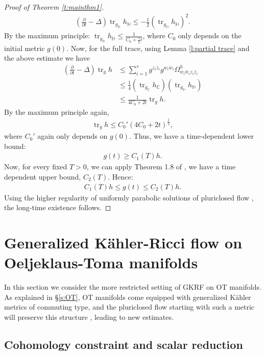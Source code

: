 \documentclass[12pt]{amsart}
\numberwithin{equation}{section}
\numberwithin{prop}{section}
\theoremstyle{definition}
\renewcommand{\bar}[1]{\overline{#1}}
\begin{document}
\begin{proof}[Proof of Theorem \ref{t:mainthm1}]
\begin{align*}
    \left(\frac{\partial}{\partial t} -\Delta \right)\operatorname{tr}_{g_\mathbb{H}}h_{\mathbb{H}} \leq - \frac{1}{2}(\operatorname{tr}_{g_\mathbb{H}}h_{\mathbb{H}})^2.
\end{align*}
By the maximum principle: $\operatorname{tr}_{g_\mathbb{H}}h_{\mathbb{H}}\leq \frac{1}{C_0+\frac{1}{2}t}$, where $C_0$ only depends on the initial metric $g(0)$.  Now, for the full trace, using Lemma \ref{l:partial trace} and the above estimate we have
\begin{align*}
    \left(\frac{\partial}{\partial t} - \Delta \right)\operatorname{tr}_g h &\leq \sum_{i=1}^s g^{z_i\bar{z}_i}g^{w_i\bar{w}_i}\Omega^h_{w_i\bar{w}_iz_i\bar{z}_i}\\
    &\leq \frac{1}{4}(\operatorname{tr}_{g_\mathbb{C}}h_\mathbb{C})(\operatorname{tr}_{g_\mathbb{H}}h_\mathbb{H})\\
    &\leq \frac{1}{4C_0+2t}\operatorname{tr}_g h.
\end{align*}
By the maximum principle again, 
\begin{align*}
    \operatorname{tr}_g h \leq C_0'(4C_0+2t)^{\frac{1}{2}},
\end{align*}
where $C_0'$ again only depends on $g(0)$. Thus, we have a time-dependent lower bound:
\begin{align*}
    g(t)\geq C_1(T) h.
\end{align*}
Now, for every fixed $T>0$, we can apply Theorem 1.8 of \cite{StreetsPCFBI}, we have a time dependent upper bound, $C_2(T)$. Hence:
\begin{align*}
    C_1(T) h\leq g(t)\leq C_2(T)h.
\end{align*}
Using the higher regularity of uniformly parabolic solutions of pluriclosed flow \cite{StreetsPCFBI, JordanStreets, garcia2023non}, the long-time existence follows.
\end{proof}

%
%
%
%
\section{Generalized K\"ahler-Ricci flow on Oeljeklaus-Toma manifolds}
%
%
%
%

In this section we consider the more restricted setting of GKRF on OT manifolds.  As explained in \S \ref{s:OT}, OT manifolds come equipped with generalized K\"ahler metrics of commuting type, and the pluriclosed flow starting with such a metric will preserve this structure \cite{GKRF}, leading to new estimates.

%
%
\subsection{Cohomology constraint and scalar reduction}
%
%
\end{document}
